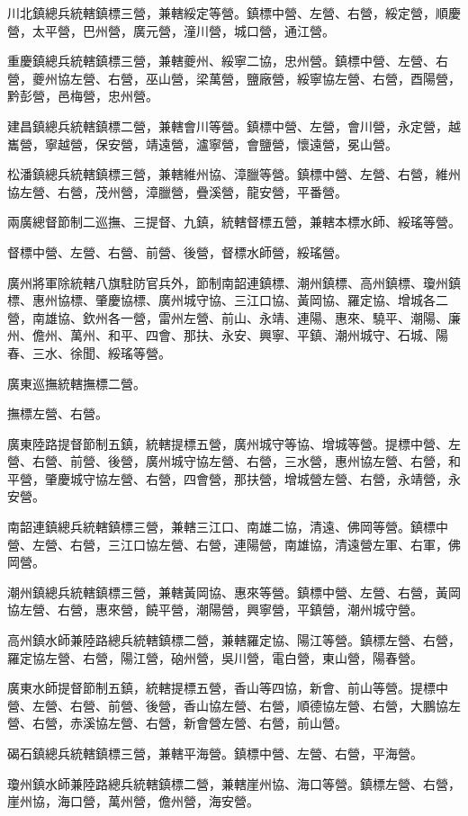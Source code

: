 \begin{pinyinscope}
川北鎮總兵統轄鎮標三營，兼轄綏定等營。鎮標中營、左營、右營，綏定營，順慶營，太平營，巴州營，廣元營，潼川營，城口營，通江營。

重慶鎮總兵統轄鎮標三營，兼轄夔州、綏寧二協，忠州營。鎮標中營、左營、右營，夔州協左營、右營，巫山營，梁萬營，鹽廠營，綏寧協左營、右營，酉陽營，黔彭營，邑梅營，忠州營。

建昌鎮總兵統轄鎮標二營，兼轄會川等營。鎮標中營、左營，會川營，永定營，越巂營，寧越營，保安營，靖遠營，瀘寧營，會鹽營，懷遠營，冕山營。

松潘鎮總兵統轄鎮標三營，兼轄維州協、漳臘等營。鎮標中營、左營、右營，維州協左營、右營，茂州營，漳臘營，疊溪營，龍安營，平番營。

兩廣總督節制二巡撫、三提督、九鎮，統轄督標五營，兼轄本標水師、綏瑤等營。

督標中營、左營、右營、前營、後營，督標水師營，綏瑤營。

廣州將軍除統轄八旗駐防官兵外，節制南韶連鎮標、潮州鎮標、高州鎮標、瓊州鎮標、惠州協標、肇慶協標、廣州城守協、三江口協、黃岡協、羅定協、增城各二營，南雄協、欽州各一營，雷州左營、前山、永靖、連陽、惠來、驍平、潮陽、廉州、儋州、萬州、和平、四會、那扶、永安、興寧、平鎮、潮州城守、石城、陽春、三水、徐聞、綏瑤等營。

廣東巡撫統轄撫標二營。

撫標左營、右營。

廣東陸路提督節制五鎮，統轄提標五營，廣州城守等協、增城等營。提標中營、左營、右營、前營、後營，廣州城守協左營、右營，三水營，惠州協左營、右營，和平營，肇慶城守協左營、右營，四會營，那扶營，增城營左營、右營，永靖營，永安營。

南韶連鎮總兵統轄鎮標三營，兼轄三江口、南雄二協，清遠、佛岡等營。鎮標中營、左營、右營，三江口協左營、右營，連陽營，南雄協，清遠營左軍、右軍，佛岡營。

潮州鎮總兵統轄鎮標三營，兼轄黃岡協、惠來等營。鎮標中營、左營、右營，黃岡協左營、右營，惠來營，饒平營，潮陽營，興寧營，平鎮營，潮州城守營。

高州鎮水師兼陸路總兵統轄鎮標二營，兼轄羅定協、陽江等營。鎮標左營、右營，羅定協左營、右營，陽江營，硇州營，吳川營，電白營，東山營，陽春營。

廣東水師提督節制五鎮，統轄提標五營，香山等四協，新會、前山等營。提標中營、左營、右營、前營、後營，香山協左營、右營，順德協左營、右營，大鵬協左營、右營，赤溪協左營、右營，新會營左營、右營，前山營。

碣石鎮總兵統轄鎮標三營，兼轄平海營。鎮標中營、左營、右營，平海營。

瓊州鎮水師兼陸路總兵統轄鎮標二營，兼轄崖州協、海口等營。鎮標左營、右營，崖州協，海口營，萬州營，儋州營，海安營。


\end{pinyinscope}
